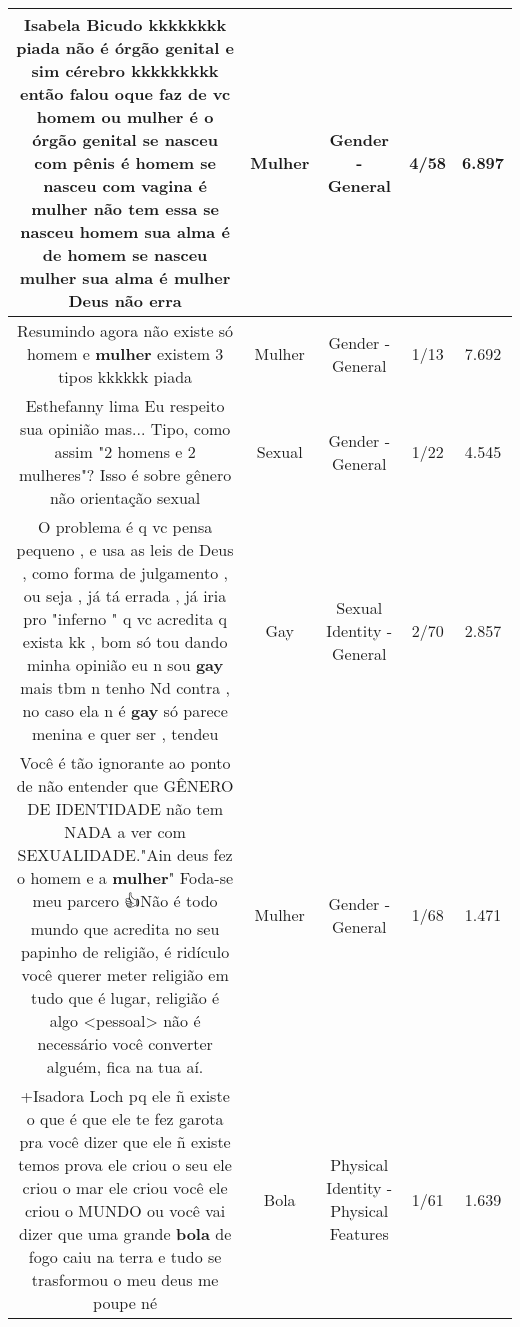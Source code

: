 \documentclass[11pt]{article}
\newlength\mylength
\begin{document}
\begin{center}
\begin{longtable}{|C{.65\mylength}|C{.30\mylength}|C{.12\mylength}|C{.12\mylength}|C{.12\mylength}|}
  \small Isabela Bicudo kkkkkkkk piada não é órgão genital e sim cérebro kkkkkkkkk então falou oque faz de vc homem ou \textbf{mulher} é o órgão genital se nasceu com pênis é homem se nasceu com vagina é \textbf{mulher} não tem essa se nasceu homem sua alma é de homem se nasceu \textbf{mulher} sua alma é \textbf{mulher} Deus não erra\normalsize   & Mulher & Gender - General & 4/58 & 6.897 \\  \hline
  \small Resumindo agora não existe só homem e \textbf{mulher} existem 3 tipos kkkkkk piada\normalsize   & Mulher & Gender - General & 1/13 & 7.692 \\  \hline
  \small Esthefanny lima Eu respeito sua opinião mas... Tipo, como assim "2 homens e 2 mulheres"? Isso é sobre gênero não orientação sexual\normalsize   & Sexual & Gender - General & 1/22 & 4.545 \\  \hline
  \small O problema é q vc pensa pequeno , e usa as leis de Deus , como forma de julgamento , ou seja , já tá errada , já iria pro "inferno " q vc acredita q exista kk , bom só tou dando minha opinião eu n sou \textbf{gay} mais tbm n tenho Nd contra , no caso ela n é \textbf{gay} só parece menina e quer ser , tendeu\normalsize   & Gay & Sexual Identity - General & 2/70 & 2.857 \\  \hline
  \small Você é tão ignorante ao ponto de não entender que GÊNERO DE IDENTIDADE não tem NADA a ver com SEXUALIDADE."Ain deus fez o homem e a \textbf{mulher}" Foda-se meu parcero 👍Não é todo mundo que acredita no seu papinho de religião, é ridículo você querer meter religião em tudo que é lugar, religião é algo <pessoal> não é necessário você converter alguém, fica na tua aí.\normalsize   & Mulher & Gender - General & 1/68 & 1.471 \\  \hline
  \small +Isadora Loch pq ele ñ existe o que é que ele te fez garota pra você dizer que ele ñ existe temos prova ele criou o seu ele criou o mar ele criou você ele criou o MUNDO ou você vai dizer que uma grande \textbf{bola} de fogo caiu na terra e tudo se trasformou o meu deus me poupe né\normalsize   & Bola & Physical Identity - Physical Features & 1/61 & 1.639 \\  \hline

\end{longtable}
\end{center}
\end{document}
